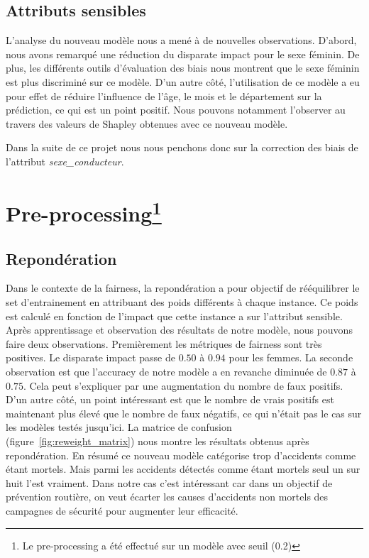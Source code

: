 \documentclass{article}
\begin{document}
    \subsection{Attributs sensibles}
    L'analyse du nouveau modèle nous a mené à de nouvelles observations. D'abord, nous avons 
    remarqué une réduction du disparate impact pour le sexe féminin. De plus, les différents 
    outils d'évaluation des biais nous montrent que le sexe féminin est plus discriminé sur 
    ce modèle. D'un autre côté, l'utilisation de ce modèle a eu pour effet de réduire l'influence de 
    l'âge, le mois et le département sur la prédiction, ce qui est un point positif. Nous pouvons notamment 
    l'observer au travers des valeurs de Shapley obtenues avec ce nouveau modèle. 
    
    Dans la suite de ce projet nous nous penchons 
    donc sur la correction des biais de l'attribut \textit{sexe\_conducteur}.



    \section[Preprocessing]{Pre-processing\footnote{Le pre-processing a été effectué sur un modèle avec seuil (0.2)}}
    \subsection{Repondération}
    Dans le contexte de la fairness, la repondération a pour objectif de rééquilibrer le set d'entrainement
    en attribuant des poids différents à chaque instance. Ce poids est calculé en fonction de l'impact 
    que cette instance a sur l'attribut sensible. 
    Après apprentissage et observation des résultats de notre modèle, nous pouvons faire deux 
    observations. Premièrement les métriques de fairness sont très positives. Le disparate impact 
    passe de $0.50$ à $0.94$ pour les femmes. La seconde observation est que l'accuracy de notre 
    modèle a en revanche diminuée de $0.87$ à $0.75$. Cela peut s'expliquer par une augmentation 
    du nombre de faux positifs. D'un autre côté, un point intéressant est que le nombre de 
    vrais positifs est maintenant plus élevé que le nombre de faux négatifs, ce qui n'était pas 
    le cas sur les modèles testés jusqu'ici.
    La matrice de confusion (figure~\ref{fig:reweight_matrix}) nous montre 
    les résultats obtenus après repondération. En
    résumé ce nouveau modèle catégorise trop d'accidents comme étant mortels. Mais parmi les accidents détectés comme
    étant mortels seul un sur huit l'est vraiment. Dans notre cas c'est intéressant car dans un objectif de prévention
    routière, on veut écarter les causes d'accidents non mortels des campagnes de sécurité pour augmenter leur efficacité.
\end{document}
